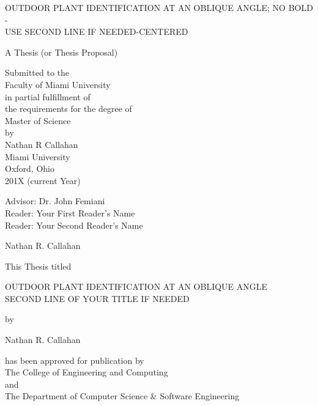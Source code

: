 \documentclass[12pt, oneside]{book}
\begin{document}
\begin{titlepage}
\begin{center}
OUTDOOR PLANT IDENTIFICATION AT AN OBLIQUE ANGLE; NO BOLD - \\USE SECOND LINE IF NEEDED-CENTERED


\vspace{1.5cm}

A Thesis (or Thesis Proposal) \\

\vspace{0.5cm}

Submitted to the \\
Faculty of Miami University \\
in partial fulfillment of \\
the requirements for the degree of \\
Master of Science \\
by \\
Nathan R Callahan \\
Miami University \\
Oxford, Ohio \\
201X (current Year)

\vspace{1.5cm}

Advisor: Dr. John Femiani\\
Reader: Your First Reader's Name\\
Reader: Your Second Reader's Name\\


\vspace{1.5cm}

 Nathan R. Callahan

\newpage

This Thesis titled

\vspace{1.0cm}

OUTDOOR PLANT IDENTIFICATION AT AN OBLIQUE ANGLE \\SECOND LINE OF YOUR TITLE IF NEEDED

\vspace{1.0cm}

by

\vspace{1.0cm}

Nathan R. Callahan

\vspace{1.0cm}

has been approved for publication by\\
\vspace{0.75cm}
The College of Engineering and Computing\\
\vspace{0.5cm}
and\\
\vspace{0.5cm}
The Department of Computer Science \& Software Engineering\\


\end{center}
\end{titlepage}
\end{document}
